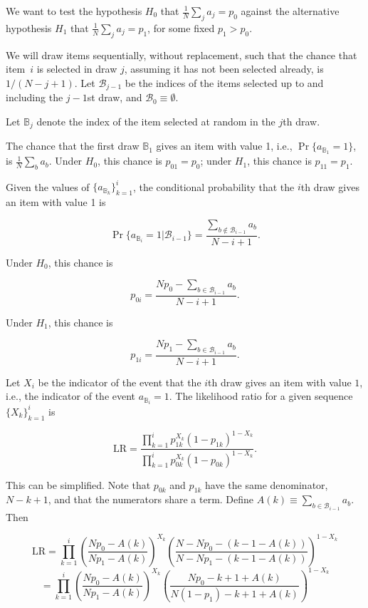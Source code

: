 \documentclass[12pt]{article}
\begin{document}
We want to test the hypothesis $H_0$ that $\frac{1}{N}\sum_j a_j = p_0$ against the
alternative hypothesis $H_1$ that $\frac{1}{N}\sum_j a_j = p_1$, for some
fixed $p_1 > p_0$.

We will draw items sequentially, without replacement, such that the chance that 
item~$i$ is selected in draw $j$, assuming it has not been selected already, is $1/(N-j+1)$.
Let ${\mathcal B_{j-1}}$ be the indices of the items selected up to and including the $j-1$st draw,
and ${\mathcal B_0} \equiv \emptyset$. 

Let $\mathbb B_j$ denote the index of the item selected at random in the $j$th draw.

The chance that the first draw ${\mathbb B_1}$ gives an item with value 1, i.e., 
$\Pr \{a_{\mathbb B_1} = 1\}$, is $\frac{1}{N}\sum_b a_b$.
Under $H_0$, this chance is $p_{01} = p_0$; under $H_1$, this chance is 
$p_{11} = p_1$.

Given the values of $\{a_{\mathbb B_k}\}_{k=1}^i$, the conditional
probability that the $i$th draw gives an item with value 1 is

$$
   \Pr \{a_{\mathbb B_i} = 1 | {\mathcal B_{i-1}} \} = \frac{ \sum_{b \notin {\mathcal B_{i-1}}} a_b}{N-i+1}.
$$

Under $H_0$, this chance is

$$
   p_{0i} =  \frac{N p_0 - \sum_{b \in {\mathcal B_{i-1}}} a_b}{N - i + 1}.
$$

Under $H_1$, this chance is

$$
   p_{1i} = \frac{N p_1 - \sum_{b \in {\mathcal B_{i-1}}} a_b}{N - i+1}.
$$

Let $X_i$ be the indicator of the event that the $i$th draw gives an item with
value $1$, i.e., the indicator of the event $a_{\mathbb B_i} = 1$.
The likelihood ratio for a given sequence $\{X_k\}_{k=1}^i$ is

$$
    \mbox{LR} = \frac{\prod_{k=1}^i p_{1k}^{X_k}(1-p_{1k})^{1-X_k}}
         {\prod_{k=1}^i p_{0k}^{X_k}(1-p_{0k})^{1-X_k}}.
$$

This can be simplified. 
Note that $p_{0k}$ and $p_{1k}$ have the same denominator,
$N - k + 1$, and that the numerators share a term.
Define $A(k) \equiv \sum_{b \in {\mathcal B_{i-1}}} a_b$.
Then

$$
    \mbox{LR} = \prod_{k=1}^i 
    \left ( \frac{N p_0 - A(k)}{Np_1 - A(k)} \right )^{X_k}
    \left ( \frac{N-N p_0 - (k-1-A(k))}{N-Np_1 - (k - 1 - A(k))} \right )^{1-X_k}
$$
$$
   = \prod_{k=1}^i  \left ( \frac{Np_0 - A(k)}{Np_1 - A(k)} \right )^{X_k}
    \left ( \frac{Np_0 - k + 1 + A(k)}{N(1-p_1) - k + 1 + A(k)} \right )^{1-X_k}
$$
\end{document}
